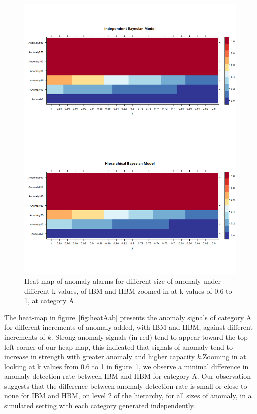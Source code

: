 \begin{figure}[!h]
	\centering
	\includegraphics[width=1\linewidth]{../../R-codes/JAGS/plots/sim1/heatA2}
	\caption{Heat-map of anomaly alarms for different size of anomaly under different k values, of IBM and HBM zoomed in at k values of 0.6 to 1, at category A.}
	\label{fig:heatA2ab}
\end{figure}

\newpage

The heat-map in figure~\ref{fig:heatAab} presents the anomaly signals of category A for different increments of anomaly added, with IBM and HBM, against different increments of $k$. Strong anomaly signals (in red) tend to appear toward the top left corner of our heap-map, this indicated that signals of anomaly tend to increase in strength with greater anomaly and higher capacity $k$.Zooming in at looking at k values from 0.6 to 1 in figure~\ref{fig:heatA2ab}, we observe a minimal difference in anomaly detection rate between IBM and HBM for category A. Our observation suggests that the difference between anomaly detection rate is small or close to none for IBM and HBM, on level 2 of the hierarchy, for all sizes of anomaly, in a simulated setting with each category generated independently. 

